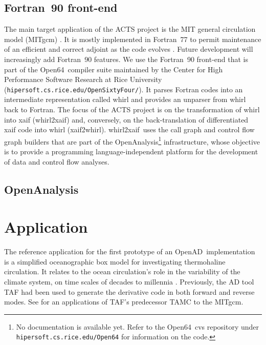 \documentclass[acmtocl,acmnow]{acmtrans2m}
\newcommand{\OpenAD}{OpenAD}
\newcommand{\OpenSixtyFour}{Open64}
\newcommand{\OpenAnalysis}{OpenAnalysis}
\newcommand{\whirlToxaif}{whirl2xaif}
\newcommand{\xaifTowhirl}{xaif2whirl}
\begin{document}
\subsection{Fortran~90 front-end} 
The main target application of the ACTS project is the MIT general circulation
model (MITgcm) \cite{mars-eta:97b,mars-eta:97a}. 
It is mostly implemented in Fortran~77 to permit maintenance of an efficient
and correct adjoint as the code evolves \cite{HHG02}. Future development will
increasingly add Fortran~90 features. We use the Fortran~90 
front-end that is part of the \OpenSixtyFour\ compiler suite 
maintained by the Center for High Performance Software
Research at Rice University 
({\tt hipersoft.cs.rice.edu/OpenSixtyFour/}). It parses
Fortran codes into an intermediate representation called whirl and
provides an unparser from whirl back to Fortran. 
The focus of the ACTS project is on the
transformation of whirl into xaif (\whirlToxaif) and, conversely, on the
back-translation of differentiated xaif code into whirl (\xaifTowhirl). 
\whirlToxaif\ uses the call graph and control flow graph builders that are part 
of the \OpenAnalysis\footnote{No documentation is available yet. 
Refer to the \OpenSixtyFour\ cvs repository under 
{\tt hipersoft.cs.rice.edu/Open64} for information on the code.} 
infrastructure, whose objective is to provide a programming
language-independent platform for the development of data and control flow 
analyses. 
\subsection{\OpenAnalysis} 

\section{Application}

The reference application for the first prototype of an \OpenAD\ implementation
is a simplified oceanographic box model for investigating
thermohaline circulation. It relates to the
ocean circulation's role in the variability of the climate system,
on time scales of decades to millennia \cite{tzi-ioa:02}.
Previously, the AD tool TAF \cite{GiKa02} 
had been used to generate the derivative
code in both forward and reverse modes.
See \cite{maro-eta:99} for an applications of
TAF's predecessor TAMC to the MITgcm.
\end{document}
